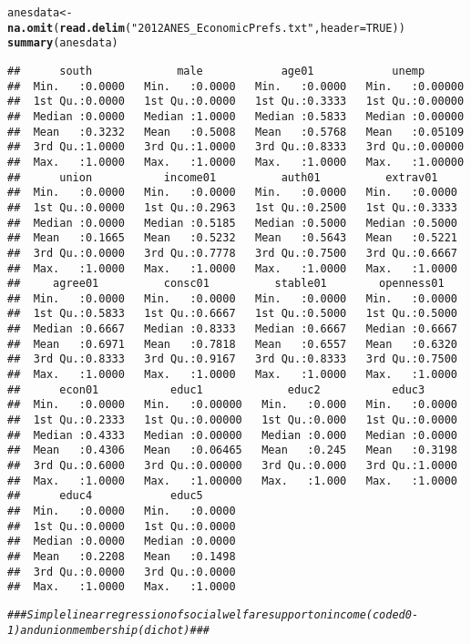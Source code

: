 \documentclass{article}\usepackage[]{graphicx}\usepackage[]{color}
\makeatletter
\newcommand{\hlnum}[1]{\textcolor[rgb]{0.686,0.059,0.569}{#1}}%
\newcommand{\hlstr}[1]{\textcolor[rgb]{0.192,0.494,0.8}{#1}}%
\newcommand{\hlcom}[1]{\textcolor[rgb]{0.678,0.584,0.686}{\textit{#1}}}%
\newcommand{\hlstd}[1]{\textcolor[rgb]{0.345,0.345,0.345}{#1}}%
\newcommand{\hlkwb}[1]{\textcolor[rgb]{0.69,0.353,0.396}{#1}}%
\newcommand{\hlkwc}[1]{\textcolor[rgb]{0.333,0.667,0.333}{#1}}%
\newcommand{\hlkwd}[1]{\textcolor[rgb]{0.737,0.353,0.396}{\textbf{#1}}}%
\newenvironment{kframe}{%
 \def\at@end@of@kframe{}%
 \ifinner\ifhmode%
  \def\at@end@of@kframe{\end{minipage}}%
  \begin{minipage}{\columnwidth}%
 \fi\fi%
 \def\FrameCommand##1{\hskip\@totalleftmargin \hskip-\fboxsep
 \colorbox{shadecolor}{##1}\hskip-\fboxsep
     \hskip-\linewidth \hskip-\@totalleftmargin \hskip\columnwidth}%
 \MakeFramed {\advance\hsize-\width
   \@totalleftmargin\z@ \linewidth\hsize
   \@setminipage}}%
 {\par\unskip\endMakeFramed%
 \at@end@of@kframe}
\newenvironment{knitrout}{}{} %
\makeatother
\begin{document}
\begin{knitrout}
\begin{kframe}
\begin{alltt}
\hlstd{anesdata} \hlkwb{<-} \hlkwd{na.omit}\hlstd{(}\hlkwd{read.delim}\hlstd{(}\hlstr{"2012 ANES_Economic Prefs.txt"}\hlstd{,} \hlkwc{header}\hlstd{=}\hlnum{TRUE}\hlstd{))}
\hlkwd{summary}\hlstd{(anesdata)}
\end{alltt}
\begin{verbatim}
##      south             male            age01            unemp        
##  Min.   :0.0000   Min.   :0.0000   Min.   :0.0000   Min.   :0.00000  
##  1st Qu.:0.0000   1st Qu.:0.0000   1st Qu.:0.3333   1st Qu.:0.00000  
##  Median :0.0000   Median :1.0000   Median :0.5833   Median :0.00000  
##  Mean   :0.3232   Mean   :0.5008   Mean   :0.5768   Mean   :0.05109  
##  3rd Qu.:1.0000   3rd Qu.:1.0000   3rd Qu.:0.8333   3rd Qu.:0.00000  
##  Max.   :1.0000   Max.   :1.0000   Max.   :1.0000   Max.   :1.00000  
##      union           income01          auth01          extrav01     
##  Min.   :0.0000   Min.   :0.0000   Min.   :0.0000   Min.   :0.0000  
##  1st Qu.:0.0000   1st Qu.:0.2963   1st Qu.:0.2500   1st Qu.:0.3333  
##  Median :0.0000   Median :0.5185   Median :0.5000   Median :0.5000  
##  Mean   :0.1665   Mean   :0.5232   Mean   :0.5643   Mean   :0.5221  
##  3rd Qu.:0.0000   3rd Qu.:0.7778   3rd Qu.:0.7500   3rd Qu.:0.6667  
##  Max.   :1.0000   Max.   :1.0000   Max.   :1.0000   Max.   :1.0000  
##     agree01          consc01          stable01        openness01    
##  Min.   :0.0000   Min.   :0.0000   Min.   :0.0000   Min.   :0.0000  
##  1st Qu.:0.5833   1st Qu.:0.6667   1st Qu.:0.5000   1st Qu.:0.5000  
##  Median :0.6667   Median :0.8333   Median :0.6667   Median :0.6667  
##  Mean   :0.6971   Mean   :0.7818   Mean   :0.6557   Mean   :0.6320  
##  3rd Qu.:0.8333   3rd Qu.:0.9167   3rd Qu.:0.8333   3rd Qu.:0.7500  
##  Max.   :1.0000   Max.   :1.0000   Max.   :1.0000   Max.   :1.0000  
##      econ01           educ1             educ2           educ3       
##  Min.   :0.0000   Min.   :0.00000   Min.   :0.000   Min.   :0.0000  
##  1st Qu.:0.2333   1st Qu.:0.00000   1st Qu.:0.000   1st Qu.:0.0000  
##  Median :0.4333   Median :0.00000   Median :0.000   Median :0.0000  
##  Mean   :0.4306   Mean   :0.06465   Mean   :0.245   Mean   :0.3198  
##  3rd Qu.:0.6000   3rd Qu.:0.00000   3rd Qu.:0.000   3rd Qu.:1.0000  
##  Max.   :1.0000   Max.   :1.00000   Max.   :1.000   Max.   :1.0000  
##      educ4            educ5       
##  Min.   :0.0000   Min.   :0.0000  
##  1st Qu.:0.0000   1st Qu.:0.0000  
##  Median :0.0000   Median :0.0000  
##  Mean   :0.2208   Mean   :0.1498  
##  3rd Qu.:0.0000   3rd Qu.:0.0000  
##  Max.   :1.0000   Max.   :1.0000
\end{verbatim}
\begin{alltt}
\hlcom{### Simple linear regression of social welfare support on income (coded 0-1) and union membership (dichot) ###}


\end{alltt}
\end{kframe}
\end{knitrout}
\end{document}
